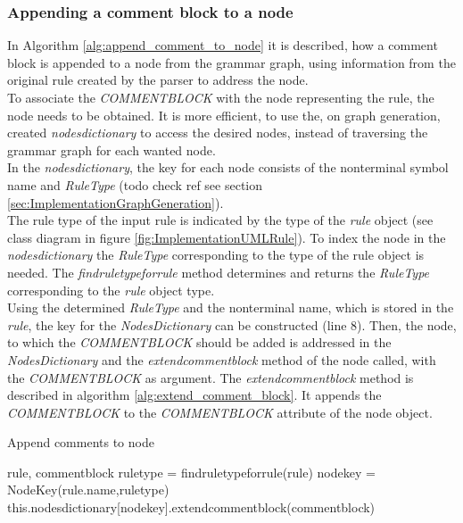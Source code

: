 \subsubsection{Appending a comment block to a node}\label{sec:ImplementationMaintainingCommentBlockWithNodes}

In Algorithm \ref{alg:append_comment_to_node} it is described, how a comment block is appended to a node from the grammar graph, using information from the original rule created by the parser to address the node.\\
To associate the \textit{COMMENT\textunderscore BLOCK} with the node representing the rule, the node needs to be obtained.
It is more efficient, to use the, on graph generation, created \textit{nodes\textunderscore dictionary} to access the desired nodes, instead of traversing the grammar graph for each wanted node.\\
In the \textit{nodes\textunderscore dictionary}, the key for each node consists of the nonterminal symbol name and \textit{RuleType} (todo check ref see section \ref{sec:ImplementationGraphGeneration}).\\
The rule type of the input rule is indicated by the type of the \textit{rule} object (see class diagram in figure \ref{fig:ImplementationUMLRule}).
To index the node in the \textit{nodes\textunderscore dictionary} the \textit{RuleType} corresponding to the type of the rule object is needed.
The \textit{find\textunderscore rule\textunderscore type\textunderscore for\textunderscore rule} method determines and returns the \textit{RuleType} corresponding to the \textit{rule} object type.\\
Using the determined \textit{RuleType} and the nonterminal name, which is stored in the \textit{rule}, the key for the \textit{Nodes\textunderscore Dictionary} can be constructed (line 8).
Then, the node, to which the \textit{COMMENT\textunderscore BLOCK} should be added is addressed in the \textit{Nodes\textunderscore Dictionary} and the \textit{extend\textunderscore comment\textunderscore block} method of the node called, with the \textit{COMMENT\textunderscore BLOCK} as argument.
The \textit{extend\textunderscore comment\textunderscore block} method is described in algorithm \ref{alg:extend_comment_block}.
It appends the \textit{COMMENT\textunderscore BLOCK} to the \textit{COMMENT\textunderscore BLOCK} attribute of the node object.

\begin{algorithm}[H]
\small
\caption{Append comments to node}
\begin{algorithmic}[1]
\algrenewcommand\algorithmicindent{0.4em}
\Require rule, comment\textunderscore block
\State rule\textunderscore type = find\textunderscore rule\textunderscore type\textunderscore for\textunderscore rule(rule)
\State node\textunderscore key = Node\textunderscore Key(rule.name,rule\textunderscore type)
\State this.nodes\textunderscore dictionary[node\textunderscore key].extend\textunderscore comment\textunderscore block(comment\textunderscore block)
\end{algorithmic}
\label{alg:append_comment_to_node}
\end{algorithm}

